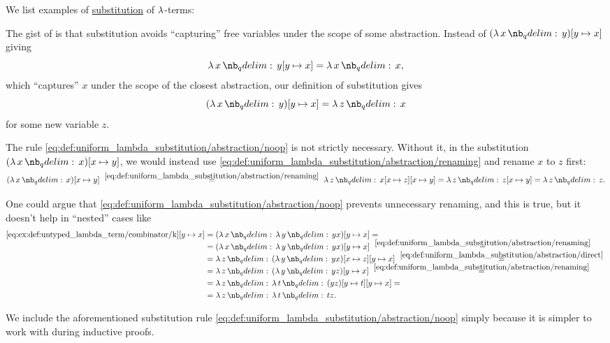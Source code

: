 \begin{example}\label{ex:def:uniform_lambda_substitution}
  We list examples of \hyperref[def:uniform_lambda_substitution]{substitution} of \( \mathrm{\lambda} \)-terms:
  \begin{thmenum}
     The gist of  is that substitution avoids \enquote{capturing} free variables under the scope of some abstraction. Instead of \( (\qabs x y)[y \mapsto x] \) giving
    \begin{equation*}
      \qabs x y[y \mapsto x] = \qabs x x,
    \end{equation*}
    which \enquote{captures} \( x \) under the scope of the closest abstraction, our definition of substitution gives
    \begin{equation*}
      (\qabs x y)[y \mapsto x] = \qabs z x
    \end{equation*}
    for some new variable \( z \).

     The rule \eqref{eq:def:uniform_lambda_substitution/abstraction/noop} is not strictly necessary. Without it, in the substitution \( (\qabs x x)[x \mapsto y] \), we would instead use \eqref{eq:def:uniform_lambda_substitution/abstraction/renaming} and rename \( x \) to \( z \) first:
    \begin{equation*}
      (\qabs x x)[x \mapsto y]
      \reloset {\eqref{eq:def:uniform_lambda_substitution/abstraction/renaming}} =
      \qabs z x[x \mapsto z][x \mapsto y]
      =
      \qabs z z[x \mapsto y]
      =
      \qabs z z.
    \end{equation*}

    One could argue that \eqref{eq:def:uniform_lambda_substitution/abstraction/noop} prevents unnecessary renaming, and this is true, but it doesn't help in \enquote{nested} cases like
    \begin{align*}
      \ref{eq:ex:def:untyped_lambda_term/combinator/k}[y \mapsto x]
      &=
      (\qabs x \qabs y yx)[y \mapsto x]
      = \\ &=
      (\qabs x \qabs y yx)[y \mapsto x]
      \reloset {\eqref{eq:def:uniform_lambda_substitution/abstraction/renaming}} = \\ &=
      \qabs z (\qabs y yx)[x \mapsto z][y \mapsto x]
      \reloset {\eqref{eq:def:uniform_lambda_substitution/abstraction/direct}} = \\ &=
      \qabs z (\qabs y yz)[y \mapsto x]
      \reloset {\eqref{eq:def:uniform_lambda_substitution/abstraction/renaming}} = \\ &=
      \qabs z \qabs t (yz)[y \mapsto t][y \mapsto x]
       = \\ &=
      \qabs z \qabs t tz.
    \end{align*}

    We include the aforementioned substitution rule \eqref{eq:def:uniform_lambda_substitution/abstraction/noop} simply because it is simpler to work with during inductive proofs.
  \end{thmenum}
\end{example}

